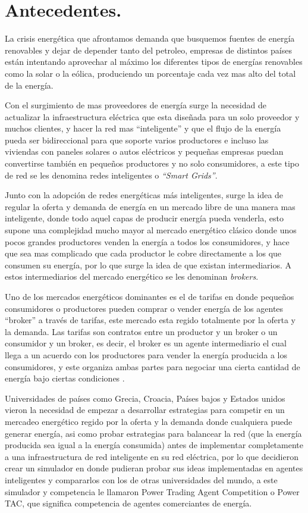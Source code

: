 \section{Antecedentes.}

La crisis energética que afrontamos demanda que busquemos fuentes de energía renovables y dejar de depender tanto del petroleo, empresas de distintos países están intentando aprovechar al máximo los diferentes tipos de energías renovables como la solar o la eólica, produciendo un porcentaje cada vez mas alto del total de la  energía. 

Con el surgimiento de mas proveedores de energía surge la necesidad de actualizar la infraestructura eléctrica que esta diseñada para un solo proveedor y muchos clientes, y hacer la red mas ``inteligente'' y que el flujo de la energía pueda ser bidireccional para que soporte varios productores e incluso las viviendas con paneles solares o autos eléctricos y pequeñas empresas puedan convertirse también en pequeños productores y no solo consumidores, a este tipo de red se les denomina redes inteligentes o \textit{``Smart Grids''}.

Junto con la adopción de redes energéticas más inteligentes, surge la idea de regular la oferta y demanda de energía en un mercado libre de una manera mas inteligente, donde todo aquel capas de producir energía pueda venderla, esto supone una complejidad mucho mayor al mercado energético clásico donde unos pocos grandes productores venden la energía a todos los consumidores, y hace que sea mas complicado que cada productor le cobre directamente a los que consumen su energía, por lo que surge la idea de que existan intermediarios. A estos intermediarios del mercado energético se les denominan \textit{brokers}.

Uno de los mercados energéticos dominantes es el de tarifas en donde pequeños consumidores o productores pueden comprar o vender energía de los agentes ``broker'' a través de tarifas, este mercado esta regido totalmente por la oferta y la demanda.
Las tarifas son contratos entre un productor y un broker o un consumidor y un broker, es decir, el broker es un agente intermediario el cual llega a un acuerdo con los productores para vender la energía producida a los consumidores, y este organiza ambas partes para negociar una cierta cantidad de energía bajo ciertas condiciones \cite{MPAlonsoAYRGonzalezDesarrolloDeTec}.

Universidades de países como Grecia, Croacia, Países bajos y Estados unidos vieron la necesidad de empezar a desarrollar estrategias para competir en un mercadeo energético regido por la oferta y la demanda donde cualquiera puede generar energía, asi como probar estrategias para balancear la red (que la energía producida sea igual a la energía consumida) antes de implementar completamente a una infraestructura de red inteligente en su red eléctrica, por lo que decidieron crear un simulador en donde pudieran probar sus ideas implementadas en agentes inteligentes y compararlos con los de otras universidades del mundo, a este simulador y competencia le llamaron Power Trading Agent Competition o Power TAC, que significa competencia de agentes comerciantes de energía.

